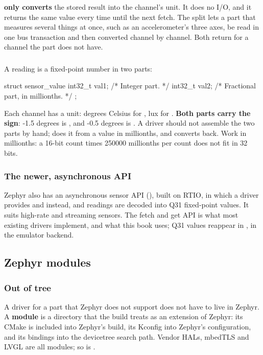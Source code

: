 \textbf{ only converts} the stored result into the channel’s unit. It does no I/O,
and it returns the same value every time until the next fetch. The split lets a part that measures
several things at once, such as an accelerometer’s three axes, be read in one bus transaction and
then converted channel by channel. Both return  for a channel the part does not have.

\subsubsection{}
A reading is a fixed-point number in two parts:

\begin{ccode}
struct sensor_value {
	int32_t val1;   /* Integer part. */
	int32_t val2;   /* Fractional part, in millionths. */
};
\end{ccode}

\noindent Each channel has a unit: degrees Celsius for , lux for
. \textbf{Both parts carry the sign}: -1.5 degrees is , and -0.5 degrees is . A driver should not assemble the
two parts by hand;
 does it from a value in millionths, and
 converts back. Work in  millionths: a 16-bit count times
250000 millionths per count does not fit in 32 bits.

\subsubsection{The newer, asynchronous API}
Zephyr also has an asynchronous sensor API (), built on RTIO, in which
a driver provides  and  instead, and readings are decoded into Q31
fixed-point values. It suits high-rate and streaming sensors. The fetch and get API is what most
existing drivers implement, and what this book uses; Q31 values reappear in , in
the emulator backend.

\subsection{Zephyr modules}

\subsubsection{Out of tree}
A driver for a part that Zephyr does not support does not have to live in Zephyr. A \textbf{module}
is a directory that the build treats as an extension of Zephyr: its CMake is included into Zephyr’s
build, its Kconfig into Zephyr’s configuration, and its bindings into the devicetree search path.
Vendor HALs, mbedTLS and LVGL are all modules; so is .

